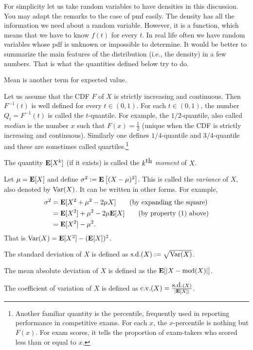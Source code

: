 \documentclass[preprint,  11pt]{amsart}
\def\half{\frac{1}{2}}
\def\sd{\mb{s.d.}}
\def\sig{{\sigma}}
\begin{document}
 For simplicity let us take random variables to have densities in this discussion. You may adapt the remarks to the case of pmf easily.  The density has all the information we need about a random variable. However, it is a function, which means that we have to know $f(t)$ for every $t$. In real life often we have random variables whose pdf is unknown or impossible to determine. It would be better to summarize the main features of the distribution (i.e., the density) in a few numbers. That is what the quantities defined below try to do. 

 Mean is another term for expected value.

 Let us assume that the CDF $F$ of $X$ is strictly increasing and continuous. Then $F^{-1}(t)$ is well defined for every $t\in (0,1)$. For each $t\in (0,1)$, the number $Q_{t}=F^{-1}(t)$ is called the $t$-quantile. For example, the $1/2$-quantile, also called {\em median} is the number $x$ such that $F(x)=\half$ (unique when the CDF is strictly increasing and continuous). Similarly one defines $1/4$-quantile and $3/4$-quantile and these are sometimes called quartiles.\footnote{Another familiar quantity is the percentile, frequently used in reporting performance in competitive exams. For each $x$, the $x$-percentile is nothing but $F(x)$. For exam scores, it  tells the proportion of exam-takers who scored less than or equal to $x$.}

 The quantity $\mathbf{E}[X^{k}]$ (if it exists) is called the $k^{\mbox{th}}$ {\em moment} of $X$. 

 Let $\mu=\mathbf{E}[X]$ and define $\sig^{2}:=\E\l[ (X-\mu)^{2}\r]$. This is called the {\em variance} of $X$, also denoted by $\mbox{Var}(X)$. It can be written in other forms. For example,
\begin{align*}
\sig^{2} &= \E[X^{2}+\mu^{2}-2\mu X] \qquad (\mb{by expanding the square})\\
 &= \E[X^{2}]+\mu^{2} - 2\mu \E[X] \qquad (\mb{by property (1) above})\\
 &= \E[X^{2}]-\mu^{2}.
\end{align*}
That is $\mbox{Var}(X)=\mathbf{E}[X^{2}]-(\mathbf{E}[X])^{2}$.

 The standard deviation of $X$ is defined as $\sd(X):=\sqrt{\Var(X)}$.

 The mean absolute deviation of $X$ is defined as the $\mathbf{E}[|X-\mbox{med}(X)|]$.

 The coefficient of variation of $X$ is defined as $\mb{c.v.}(X)=\frac{\sd(X)}{|{\bf E}[X]|}$.
\end{document}

